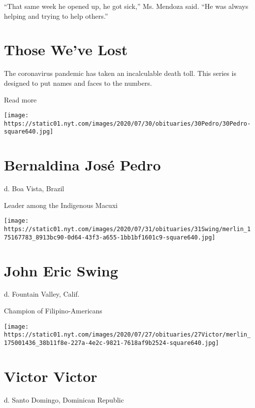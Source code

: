 ``That same week he opened up, he got sick,'' Ms. Mendoza said. ``He was
always helping and trying to help others.''

\href{https://www.nytimes.com/interactive/2020/obituaries/people-died-coronavirus-obituaries.html?action=click\&pgtype=Article\&state=default\&region=BELOW_MAIN_CONTENT\&context=covid_obits_promo}{}

\hypertarget{those-weve-lost}{%
\section{Those We've Lost}\label{those-weve-lost}}

The coronavirus pandemic has taken an incalculable death toll. This
series is designed to put names and faces to the numbers.

Read more

\texttt{[image: https://static01.nyt.com/images/2020/07/30/obituaries/30Pedro/30Pedro-square640.jpg]}

\hypertarget{bernaldina-josuxe9-pedro}{%
\section{Bernaldina José Pedro}\label{bernaldina-josuxe9-pedro}}

d. Boa Vista, Brazil

Leader among the Indigenous Macuxi

\texttt{[image: https://static01.nyt.com/images/2020/07/31/obituaries/31Swing/merlin\_175167783\_8913bc90-0d64-43f3-a655-1bb1bf1601c9-square640.jpg]}

\hypertarget{john-eric-swing}{%
\section{John Eric Swing}\label{john-eric-swing}}

d. Fountain Valley, Calif.

Champion of Filipino-Americans

\texttt{[image: https://static01.nyt.com/images/2020/07/27/obituaries/27Victor/merlin\_175001436\_38b11f8e-227a-4e2c-9821-7618af9b2524-square640.jpg]}

\hypertarget{victor-victor}{%
\section{Victor Victor}\label{victor-victor}}

d. Santo Domingo, Dominican Republic

